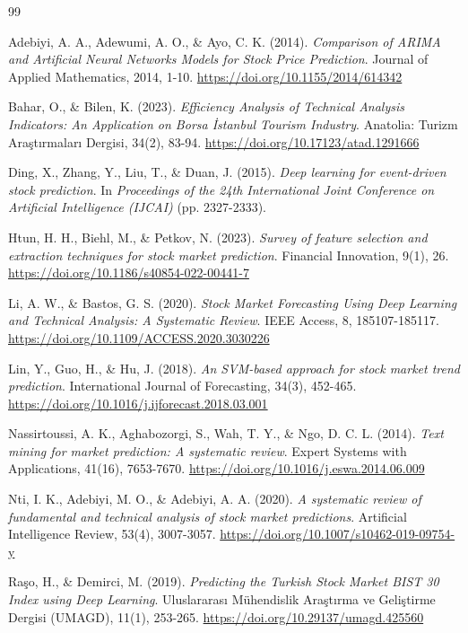 \documentclass[12pt,a4paper]{report}
\begin{document}
\begin{thebibliography}{99}

Adebiyi, A. A., Adewumi, A. O., \& Ayo, C. K. (2014). \emph{Comparison of ARIMA and Artificial Neural Networks Models for Stock Price Prediction}. Journal of Applied Mathematics, 2014, 1-10. \url{https://doi.org/10.1155/2014/614342}

Bahar, O., \& Bilen, K. (2023). \emph{Efficiency Analysis of Technical Analysis Indicators: An Application on Borsa İstanbul Tourism Industry}. Anatolia: Turizm Araştırmaları Dergisi, 34(2), 83-94. \url{https://doi.org/10.17123/atad.1291666}

Ding, X., Zhang, Y., Liu, T., \& Duan, J. (2015). \emph{Deep learning for event-driven stock prediction}. In \emph{Proceedings of the 24th International Joint Conference on Artificial Intelligence (IJCAI)} (pp. 2327-2333).

Htun, H. H., Biehl, M., \& Petkov, N. (2023). \emph{Survey of feature selection and extraction techniques for stock market prediction}. Financial Innovation, 9(1), 26. \url{https://doi.org/10.1186/s40854-022-00441-7}

Li, A. W., \& Bastos, G. S. (2020). \emph{Stock Market Forecasting Using Deep Learning and Technical Analysis: A Systematic Review}. IEEE Access, 8, 185107-185117. \url{https://doi.org/10.1109/ACCESS.2020.3030226}

Lin, Y., Guo, H., \& Hu, J. (2018). \emph{An SVM-based approach for stock market trend prediction}. International Journal of Forecasting, 34(3), 452-465. \url{https://doi.org/10.1016/j.ijforecast.2018.03.001}

Nassirtoussi, A. K., Aghabozorgi, S., Wah, T. Y., \& Ngo, D. C. L. (2014). \emph{Text mining for market prediction: A systematic review}. Expert Systems with Applications, 41(16), 7653-7670. \url{https://doi.org/10.1016/j.eswa.2014.06.009}

Nti, I. K., Adebiyi, M. O., \& Adebiyi, A. A. (2020). \emph{A systematic review of fundamental and technical analysis of stock market predictions}. Artificial Intelligence Review, 53(4), 3007-3057. \url{https://doi.org/10.1007/s10462-019-09754-y}

Raşo, H., \& Demirci, M. (2019). \emph{Predicting the Turkish Stock Market BIST 30 Index using Deep Learning}. Uluslararası Mühendislik Araştırma ve Geliştirme Dergisi (UMAGD), 11(1), 253-265. \url{https://doi.org/10.29137/umagd.425560}


\end{thebibliography}
\end{document}
